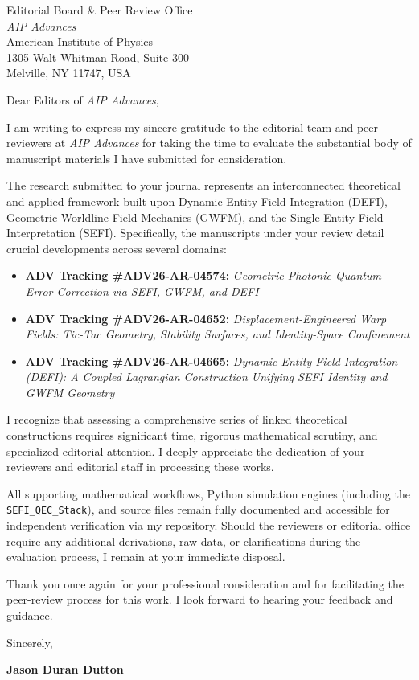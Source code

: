 \documentclass[11pt,a4paper]{letter}
\date{\today}
\begin{document}
\begin{letter}{
    Editorial Board \& Peer Review Office \\
    \emph{AIP Advances} \\
    American Institute of Physics \\
    1305 Walt Whitman Road, Suite 300 \\
    Melville, NY 11747, USA
}

\opening{Dear Editors of \emph{AIP Advances},}

I am writing to express my sincere gratitude to the editorial team and peer reviewers at \emph{AIP Advances} for taking the time to evaluate the substantial body of manuscript materials I have submitted for consideration. 

The research submitted to your journal represents an interconnected theoretical and applied framework built upon Dynamic Entity Field Integration (DEFI), Geometric Worldline Field Mechanics (GWFM), and the Single Entity Field Interpretation (SEFI). Specifically, the manuscripts under your review detail crucial developments across several domains:
\begin{itemize}
    \item \textbf{ADV Tracking \#ADV26-AR-04574:} \emph{Geometric Photonic Quantum Error Correction via SEFI, GWFM, and DEFI}
    \item \textbf{ADV Tracking \#ADV26-AR-04652:} \emph{Displacement-Engineered Warp Fields: Tic-Tac Geometry, Stability Surfaces, and Identity-Space Confinement}
    \item \textbf{ADV Tracking \#ADV26-AR-04665:} \emph{Dynamic Entity Field Integration (DEFI): A Coupled Lagrangian Construction Unifying SEFI Identity and GWFM Geometry}
\end{itemize}

I recognize that assessing a comprehensive series of linked theoretical constructions requires significant time, rigorous mathematical scrutiny, and specialized editorial attention. I deeply appreciate the dedication of your reviewers and editorial staff in processing these works. 

All supporting mathematical workflows, Python simulation engines (including the \texttt{SEFI\_QEC\_Stack}), and source files remain fully documented and accessible for independent verification via my repository. Should the reviewers or editorial office require any additional derivations, raw data, or clarifications during the evaluation process, I remain at your immediate disposal.

Thank you once again for your professional consideration and for facilitating the peer-review process for this work. I look forward to hearing your feedback and guidance.

\closing{Sincerely,}

\vspace{0.5cm}
\noindent\textbf{Jason Duran Dutton}

\end{letter}
\end{document}
